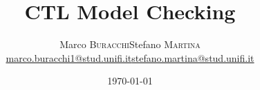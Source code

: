 





\title[CTL model checking]{\textbf{CTL Model Checking}}
\date[\today]{\flushright \today}

\author[Buracchi M. - Martina S.]{
  \begin{center}
    \begin{tabular}{lr}
      Marco \textsc{Buracchi} & Stefano \textsc{Martina}\\
      \href{mailto:marco.buracchi1@stud.unifi.it}{marco.buracchi1@stud.unifi.it}&
      \href{mailto:stefano.martina@stud.unifi.it}{stefano.martina@stud.unifi.it}\\
    \end{tabular}
  \end{center}
}




\begin{frame}[plain]
  \titlepage
\end{frame}

